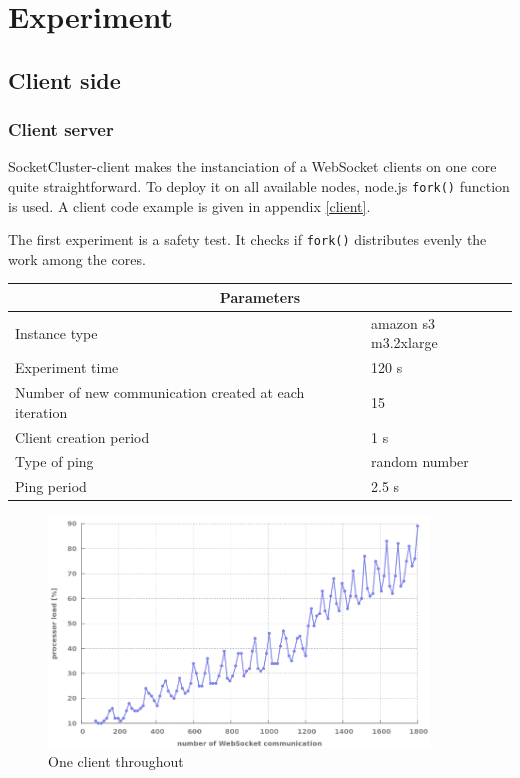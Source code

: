 \chapter{Experiment} 
\label{Chapter3} 

\section{Client side}

\subsection{Client server} 

SocketCluster-client makes the instanciation of a WebSocket clients on one core quite straightforward. To deploy it on all available nodes, node.js \texttt{fork()} function is used. A client code example is given in appendix \ref{client}.

The first experiment is a safety test. It checks if \texttt{fork()} distributes evenly the work among the cores.

\begin{center}
  \begin{tabular}{ | l | l |}
  \hline
  \multicolumn{2}{|c|}{Parameters} \\
  \hline
    Instance type &  amazon s3 m3.2xlarge\\ 
    Experiment time & 120 s \\
    Number of new communication created at each iteration & 15 \\
    Client creation period & 1 s \\
    Type of ping & random number \\ 
    Ping period & 2.5 s \\ 
  \hline
  \end{tabular}
\end{center}

\begin{figure}[H]
	\centering
		\includegraphics[width=0.9\textwidth]{./Figures/1_client.png}
	\caption[1_client]{One client throughout}
	\label{fig:1_client}
\end{figure}

